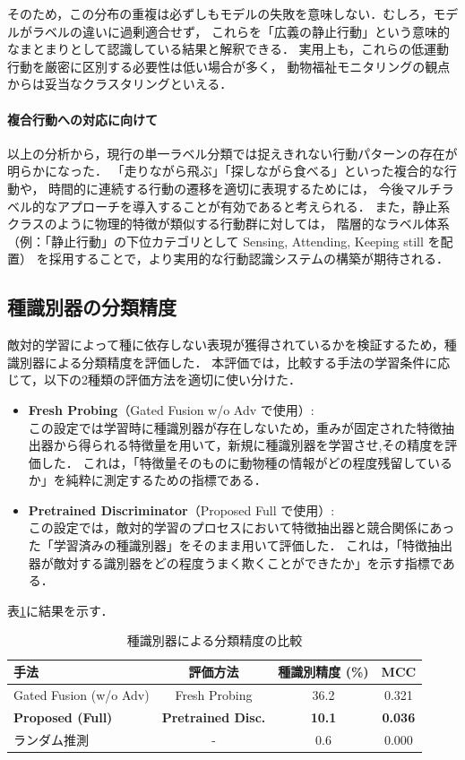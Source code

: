 そのため，この分布の重複は必ずしもモデルの失敗を意味しない．むしろ，モデルがラベルの違いに過剰適合せず，
これらを「広義の静止行動」という意味的なまとまりとして認識している結果と解釈できる．
実用上も，これらの低運動行動を厳密に区別する必要性は低い場合が多く，
動物福祉モニタリングの観点からは妥当なクラスタリングといえる．

\paragraph{複合行動への対応に向けて}
以上の分析から，現行の単一ラベル分類では捉えきれない行動パターンの存在が明らかになった．
「走りながら飛ぶ」「探しながら食べる」といった複合的な行動や，
時間的に連続する行動の遷移を適切に表現するためには，
今後マルチラベル的なアプローチを導入することが有効であると考えられる．
また，静止系クラスのように物理的特徴が類似する行動群に対しては，
階層的なラベル体系（例：「静止行動」の下位カテゴリとして Sensing, Attending, Keeping still を配置）
を採用することで，より実用的な行動認識システムの構築が期待される．

\subsection{種識別器の分類精度}
敵対的学習によって種に依存しない表現が獲得されているかを検証するため，種識別器による分類精度を評価した．
本評価では，比較する手法の学習条件に応じて，以下の2種類の評価方法を適切に使い分けた．

\begin{itemize}
  \item \textbf{Fresh Probing}（Gated Fusion w/o Adv で使用）: \\
  この設定では学習時に種識別器が存在しないため，重みが固定された特徴抽出器から得られる特徴量を用いて，新規に種識別器を学習させ,その精度を評価した．
  これは，「特徴量そのものに動物種の情報がどの程度残留しているか」を純粋に測定するための指標である．

  \item \textbf{Pretrained Discriminator}（Proposed Full で使用）: \\
  この設定では，敵対的学習のプロセスにおいて特徴抽出器と競合関係にあった「学習済みの種識別器」をそのまま用いて評価した．
  これは，「特徴抽出器が敵対する識別器をどの程度うまく欺くことができたか」を示す指標である．
\end{itemize}

表\ref{tab:species_acc}に結果を示す．

\begin{table}[t]
  \centering
  \caption{種識別器による分類精度の比較}
  \label{tab:species_acc}
  \begin{tabular}{lccc}
    \hline
    手法 & 評価方法 & 種識別精度 (\%) & MCC \\
    \hline \hline
    Gated Fusion (w/o Adv) & Fresh Probing & 36.2 & 0.321 \\
    \textbf{Proposed (Full)} & \textbf{Pretrained Disc.} & \textbf{10.1} & \textbf{0.036} \\
    \hline
    ランダム推測 & - & 0.6 & 0.000 \\
    \hline
  \end{tabular}
\end{table}

